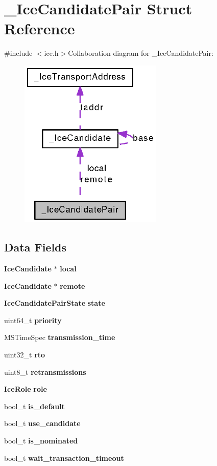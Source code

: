 \section{\_\-IceCandidatePair Struct Reference}
\label{struct__IceCandidatePair}


{\ttfamily \#include $<$ice.h$>$}Collaboration diagram for \_\-IceCandidatePair:\nopagebreak
\begin{figure}[H]
\begin{center}
\leavevmode
\includegraphics[width=193pt]{struct__IceCandidatePair__coll__graph}
\end{center}
\end{figure}
\subsection*{Data Fields}
\begin{DoxyCompactItemize}
\item 
{\bf IceCandidate} $\ast$ {\bf local}
\item 
{\bf IceCandidate} $\ast$ {\bf remote}
\item 
{\bf IceCandidatePairState} {\bf state}
\item 
uint64\_\-t {\bf priority}
\item 
MSTimeSpec {\bf transmission\_\-time}
\item 
uint32\_\-t {\bf rto}
\item 
uint8\_\-t {\bf retransmissions}
\item 
{\bf IceRole} {\bf role}
\item 
bool\_\-t {\bf is\_\-default}
\item 
bool\_\-t {\bf use\_\-candidate}
\item 
bool\_\-t {\bf is\_\-nominated}
\item 
bool\_\-t {\bf wait\_\-transaction\_\-timeout}
\end{DoxyCompactItemize}


